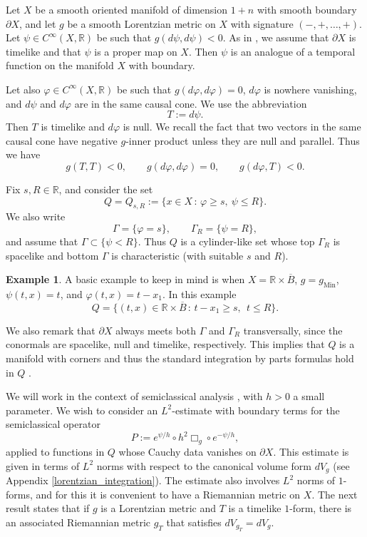 \documentclass[11pt,letterpaper]{amsart}
\theoremstyle{definition}
\newtheorem{Example}[Theorem]{Example}
\numberwithin{equation}{section}
\newcommand{\mR}{\mathbb{R}}                    %
\newcommand{\ol}[1]{\overline{#1}}
\newcommand{\p}{\partial}
\newcommand{\gm}{g_{\mathrm{Min}}}
\def\p{\partial}
\begin{document}
Let $X$ be a smooth oriented manifold of dimension $1+n$ with smooth boundary $\p X$, and let $g$ be a smooth Lorentzian metric on $X$ with signature $(-,+,\ldots,+)$. Let $\psi \in C^{\infty}(X, \mR)$ be such that $g(d\psi, d\psi) < 0$. As in \cite[Section 24.1]{hormander}, we assume that $\p X$ is timelike and that $\psi$ is a proper map on $X$. Then $\psi$ is an analogue of a temporal function on the manifold $X$ with boundary. 

Let also $\varphi \in C^{\infty}(X,\mR)$ be such that $g(d\varphi,d\varphi) = 0$, $d\varphi$ is nowhere vanishing, and $d\psi$ and $d\varphi$ are in the same causal cone. We use the abbreviation 
\[
T := d\psi.
\]
Then $T$ is timelike and $d\varphi$ is null. We recall the fact that two vectors in the same causal cone have negative $g$-inner product unless they are null and parallel. Thus we have 
\[
g(T, T) < 0, \qquad g(d\varphi, d\varphi) = 0, \qquad g(d\varphi, T) < 0.
\]

Fix $s, R \in \mR$, and consider the set 
\[
Q = Q_{s,R} := \{ x \in X \,:\, \varphi \geq s, \ \psi \leq R \}.
\]
We also write 
\[
\Gamma = \{ \varphi = s \}, \qquad \Gamma_{R} = \{ \psi = R \},
\]
and assume that $\Gamma \subset \{ \psi < R \}$. Thus $Q$ is a cylinder-like set whose top $\Gamma_R$ is spacelike and bottom $\Gamma$ is characteristic (with suitable $s$ and $R$).

\begin{Example}
A basic example to keep in mind is when $X = \mR \times \ol{B}$, $g = \gm$, $\psi(t,x) = t$, and $\varphi(t,x) = t - x_1$. In this example 
\[
Q = \{ (t,x) \in \mR \times \ol{B} \,:\, t-x_1 \geq s, \ \ t \leq R \}.
\]
\end{Example}

We also remark that $\p X$ always meets both $\Gamma$ and $\Gamma_R$ transversally, since the conormals are spacelike, null and timelike, respectively. This implies that $Q$ is a manifold with corners and thus the standard integration by parts formulas hold in $Q$ \cite{lee2002}.




We will work in the context of semiclassical analysis \cite{zworski2012}, with $h > 0$ a small parameter. We wish to consider an $L^2$-estimate with boundary terms for the semiclassical operator 
\[
P := e^{\psi/h} \circ h^2 \Box_g \circ e^{-\psi/h},
\]
applied to functions in $Q$ whose Cauchy data vanishes on $\p X$. This estimate is given in terms of $L^2$ norms with respect to the canonical volume form $dV_g$ (see Appendix \ref{lorentzian_integration}). The estimate also involves $L^2$ norms of $1$-forms, and for this it is convenient to have a Riemannian metric on $X$. The next result states that if $g$ is a Lorentzian metric and $T$ is a timelike $1$-form, there is an associated Riemannian metric $g_T$ that satisfies $dV_{g_T} = dV_g$.
\end{document}
